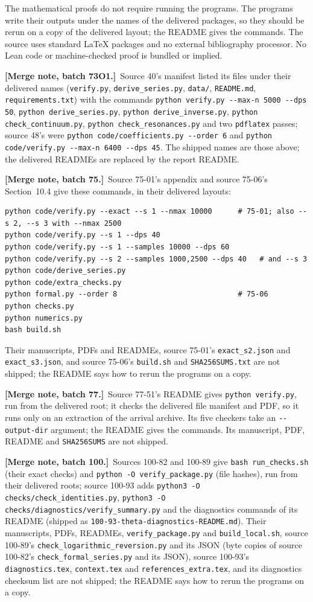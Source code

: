 \documentclass[11pt]{article}
\numberwithin{equation}{section}
\theoremstyle{definition}\newtheorem{definition}[theorem]{Definition}
\theoremstyle{remark}\newtheorem{remark}[theorem]{Remark}
\newcommand{\mergenote}[1]{\par\smallskip\noindent\textbf{[Merge note, batch 73O1.]}\ #1\par\smallskip}
\newcommand{\file}[1]{\nolinkurl{#1}}
\newcommand{\mergenoteb}[1]{\par\smallskip\noindent\textbf{[Merge note, batch 75.]}\ #1\par\smallskip}
\newcommand{\mergenotec}[1]{\par\smallskip\noindent\textbf{[Merge note, batch 77.]}\ #1\par\smallskip}
\newcommand{\mergenoted}[1]{\par\smallskip\noindent\textbf{[Merge note, batch 100.]}\ #1\par\smallskip}
\begin{document}
The mathematical proofs do not require running the programs.  The programs
write their outputs under the names of the delivered packages, so they should
be rerun on a copy of the delivered layout; the README gives the commands.
The source uses standard LaTeX packages and no external bibliography processor.
No Lean code or machine-checked proof is bundled or implied.
\mergenote{Source 40's manifest listed its files under their delivered names
(\file{verify.py}, \file{derive_series.py}, \file{data/}, \file{README.md},
\file{requirements.txt}) with the commands
\texttt{python verify.py -{}-max-n 5000 -{}-dps 50},
\texttt{python derive\_series.py}, \texttt{python derive\_inverse.py},
\texttt{python check\_continuum.py}, \texttt{python check\_resonances.py} and
two \texttt{pdflatex} passes; source 48's were
\texttt{python code/coefficients.py -{}-order 6} and
\texttt{python code/verify.py -{}-max-n 6400 -{}-dps 45}.  The shipped names are
those above; the delivered READMEs are replaced by the report README.}
\mergenoteb{Source 75-01's appendix and source 75-06's Section~10.4 give
these commands, in their delivered layouts:}
\begin{lstlisting}
python code/verify.py --exact --s 1 --nmax 10000      # 75-01; also --s 2, --s 3 with --nmax 2500
python code/verify.py --s 1 --dps 40
python code/verify.py --s 1 --samples 10000 --dps 60
python code/verify.py --s 2 --samples 1000,2500 --dps 40   # and --s 3
python code/derive_series.py
python code/extra_checks.py
python formal.py --order 8                            # 75-06
python checks.py
python numerics.py
bash build.sh
\end{lstlisting}
Their manuscripts, PDFs and READMEs, source 75-01's \file{exact_s2.json} and
\file{exact_s3.json}, and source 75-06's \file{build.sh} and
\file{SHA256SUMS.txt} are not shipped; the README says how to rerun the
programs on a copy.
\mergenotec{Source 77-51's README gives \texttt{python verify.py}, run from
the delivered root; it checks the delivered file manifest and PDF, so it runs
only on an extraction of the arrival archive.  Its five checkers take an
\texttt{-{}-output-dir} argument; the README gives the commands.  Its
manuscript, PDF, README and \file{SHA256SUMS} are not shipped.}
\mergenoted{Sources 100-82 and 100-89 give \texttt{bash run\_checks.sh} (their
exact checks) and \texttt{python -O verify\_package.py} (file hashes), run from
their delivered roots; source 100-93 adds \texttt{python3 -O
checks/check\_identities.py}, \texttt{python3 -O
checks/diagnostics/verify\_summary.py} and the diagnostics commands of its
README (shipped as \file{100-93-theta-diagnostics-README.md}).  Their
manuscripts, PDFs, READMEs, \file{verify_package.py} and \file{build_local.sh},
source 100-89's \file{check_logarithmic_reversion.py} and its JSON (byte copies
of source 100-82's \file{check_formal_series.py} and its JSON), source 100-93's
\file{diagnostics.tex}, \file{context.tex} and \file{references_extra.tex}, and
its diagnostics checksum list are not shipped; the README says how to rerun
the programs on a copy.}
\end{document}
